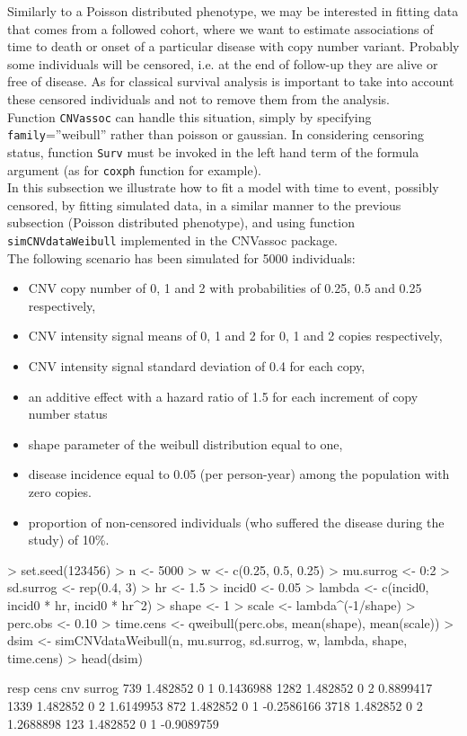 \documentclass[11pt]{article}
\begin{document}
Similarly to a Poisson distributed phenotype, we may be interested in fitting data that comes from a 
followed cohort, where we want to estimate associations of time to death or onset of a particular disease with copy number 
variant.
Probably some individuals will be censored, i.e. at the end of follow-up they are alive or free 
of disease.
As for classical survival analysis is important to take into account these censored individuals 
and not to remove them from the analysis.  \\


Function \texttt{CNVassoc} can handle this situation, simply by specifying 
\texttt{family}=''weibull'' rather than poisson or gaussian.
In considering censoring status, function \texttt{Surv} must be invoked in the left hand term of
the formula argument (as for \texttt{coxph} function for example).\\

In this subsection we illustrate how to fit a model with time to event, possibly censored, by fitting simulated data, in a similar manner 
to the previous subsection (Poisson distributed phenotype), and using function \texttt{simCNVdataWeibull} implemented in 
the CNVassoc package.\\

The following scenario has been simulated for 5000 individuals:
\begin{itemize}
\item CNV copy number of 0, 1 and 2 with probabilities of 0.25, 0.5 and 0.25 respectively,
\item CNV intensity signal means of 0, 1 and 2 for 0, 1 and 2 copies respectively,
\item CNV intensity signal standard deviation of 0.4 for each copy,
\item an additive effect with a hazard ratio of 1.5 for each increment of copy number status
\item shape parameter of the weibull distribution equal to one,
\item disease incidence equal to 0.05 (per person-year) among the population with zero copies. 
\item proportion of non-censored individuals (who suffered the disease during the study) of 10\%. 
\end{itemize}
\begin{Schunk}
\begin{Sinput}
> set.seed(123456)
> n <- 5000
> w <- c(0.25, 0.5, 0.25)
> mu.surrog <- 0:2
> sd.surrog <- rep(0.4, 3)
> hr <- 1.5
> incid0 <- 0.05
> lambda <- c(incid0, incid0 * hr, incid0 * hr^2)
> shape <- 1
> scale <- lambda^(-1/shape)
> perc.obs <- 0.10
> time.cens <- qweibull(perc.obs, mean(shape), mean(scale))
> dsim <- simCNVdataWeibull(n, mu.surrog, sd.surrog, w, lambda, shape, time.cens)
> head(dsim)
\end{Sinput}
\begin{Soutput}
         resp cens cnv     surrog
739  1.482852    0   1  0.1436988
1282 1.482852    0   2  0.8899417
1339 1.482852    0   2  1.6149953
872  1.482852    0   1 -0.2586166
3718 1.482852    0   2  1.2688898
123  1.482852    0   1 -0.9089759
\end{Soutput}
\end{Schunk}
\end{document}
